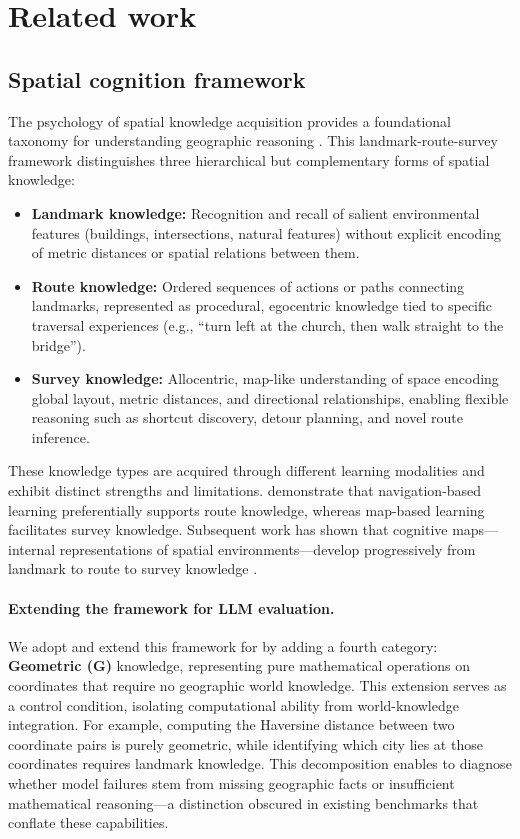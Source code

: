 \section{Related work}
\label{sec:related}

\subsection{Spatial cognition framework}

The psychology of spatial knowledge acquisition provides a foundational taxonomy for understanding geographic reasoning \citep{siegel1975development}. This landmark-route-survey framework distinguishes three hierarchical but complementary forms of spatial knowledge:

\begin{itemize}[leftmargin=*, itemsep=1pt]
    \item \textbf{Landmark knowledge:} Recognition and recall of salient environmental features (buildings, intersections, natural features) without explicit encoding of metric distances or spatial relations between them.
    \item \textbf{Route knowledge:} Ordered sequences of actions or paths connecting landmarks, represented as procedural, egocentric knowledge tied to specific traversal experiences (e.g., ``turn left at the church, then walk straight to the bridge'').
    \item \textbf{Survey knowledge:} Allocentric, map-like understanding of space encoding global layout, metric distances, and directional relationships, enabling flexible reasoning such as shortcut discovery, detour planning, and novel route inference.
\end{itemize}

These knowledge types are acquired through different learning modalities and exhibit distinct strengths and limitations. \citet{thorndyke1982differences} demonstrate that navigation-based learning preferentially supports route knowledge, whereas map-based learning facilitates survey knowledge. Subsequent work has shown that cognitive maps---internal representations of spatial environments---develop progressively from landmark to route to survey knowledge \citep{montello1998new}.

\paragraph{Extending the framework for LLM evaluation.}
We adopt and extend this framework for \dsName by adding a fourth category: \textbf{Geometric (G)} knowledge, representing pure mathematical operations on coordinates that require no geographic world knowledge. This extension serves as a control condition, isolating computational ability from world-knowledge integration. For example, computing the Haversine distance between two coordinate pairs is purely geometric, while identifying which city lies at those coordinates requires landmark knowledge. This decomposition enables \dsName to diagnose whether model failures stem from missing geographic facts or insufficient mathematical reasoning---a distinction obscured in existing benchmarks that conflate these capabilities.

